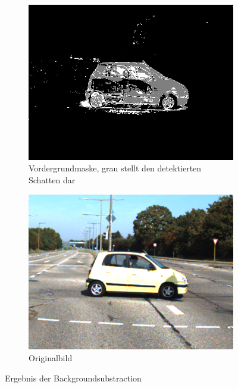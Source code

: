 \documentclass[conference]{IEEEtran}
\begin{document}
\begin{figure}
\centering
\begin{subfigure}[t]{.23\textwidth}
\centering
  \includegraphics[width=1\linewidth]{trainds01_foregroundmask}
  \caption{Vordergrundmaske, grau stellt den detektierten Schatten dar}
  \label{fig:foregroundmask}
\end{subfigure}
\begin{subfigure}[t]{.23\textwidth}
\centering
  \includegraphics[width=1\linewidth]{trainds01_original}
  \caption{Originalbild}
  \label{fig:foreground_original}
\end{subfigure}
\caption{Ergebnis der Backgroundsubstraction}
\label{fig:test}
\end{figure}
\end{document}
